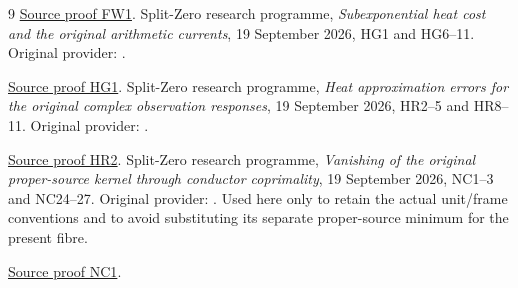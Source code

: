 \documentclass[11pt]{article}
\begin{document}
\begin{thebibliography}{9}
\href{https://github.com/KokunoYumeto/zeta-function-research-reader/blob/5992ad50c0f2a06921f1fcaded7b4e38097c0739/workbenches/splitzero-tandem/continuations/20260920-original-kernel-mixed-determinants/providers/FULL_WINDOW_SOURCE_PRODUCTS.tex\#L28}{Source proof FW1}.
Split-Zero research programme,
\emph{Subexponential heat cost and the original arithmetic currents},
19 September 2026, HG1 and HG6--11.
Original provider: .


\href{https://github.com/KokunoYumeto/zeta-function-research-reader/blob/5992ad50c0f2a06921f1fcaded7b4e38097c0739/workbenches/splitzero-tandem/continuations/20260920-original-kernel-mixed-determinants/providers/HEAT_GROWTH_AND_ORIGINAL_CURRENTS.tex\#L31}{Source proof HG1}.
Split-Zero research programme,
\emph{Heat approximation errors for the original complex observation responses},
19 September 2026, HR2--5 and HR8--11.
Original provider: .


\href{https://github.com/KokunoYumeto/zeta-function-research-reader/blob/5992ad50c0f2a06921f1fcaded7b4e38097c0739/workbenches/splitzero-tandem/continuations/20260920-original-kernel-mixed-determinants/providers/HEAT_OBSERVATION_RESPONSE_ERRORS.tex\#L32}{Source proof HR2}.
Split-Zero research programme,
\emph{Vanishing of the original proper-source kernel through conductor coprimality},
19 September 2026, NC1--3 and NC24--27.
Original provider: .
Used here only to retain the actual unit/frame conventions and to avoid
substituting its separate proper-source minimum for the present fibre.

\href{https://github.com/KokunoYumeto/zeta-function-research-reader/blob/5992ad50c0f2a06921f1fcaded7b4e38097c0739/workbenches/splitzero-tandem/continuations/20260920-original-kernel-mixed-determinants/providers/ORIGINAL_CONDUCTOR_COPRIMALITY.tex\#L41}{Source proof NC1}.
\end{thebibliography}
\end{document}
